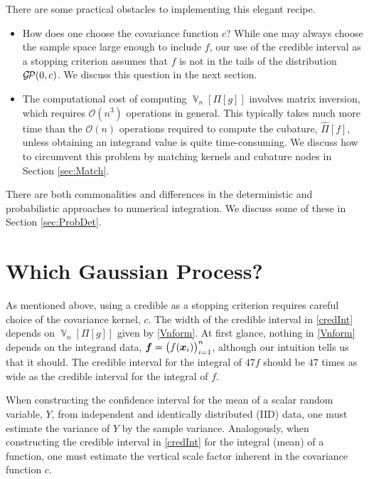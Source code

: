 \documentclass[sts]{imsart}
\numberwithin{equation}{section}
\theoremstyle{plain}
\newcommand{\calGP}{\cg\!\cp}
\DeclareMathOperator{\Var}{\mathbb{V}}
\begin{document}
There are some practical obstacles to implementing this elegant recipe. 

\begin{itemize} 

\item How does one choose the covariance function $c$?  While one may always choose the sample space large enough to include $f$, our use of the credible interval as a stopping criterion assumes that $f$ is not in the tails of the distribution $\calGP(0,c)$.  We discuss this question in the next section.  

\item The computational cost of computing $\Var_n[\Pi[g]]$ involves matrix inversion, which requires $\mathcal{O}(n^3)$ operations in general.  This typically takes much more time than the $\mathcal{O}(n)$ operations required to compute the cubature, $\hat{\Pi}[f]$, unless obtaining an integrand value is quite time-consuming. We discuss how to circumvent this problem by matching kernels and cubature nodes in Section \ref{sec:Match}.

\end{itemize}
There are both commonalities and differences in the deterministic and probabilistic approaches to numerical integration.  We discuss some of these in Section \ref{sec:ProbDet}.

\section{Which Gaussian Process?} \label{sec:WhichGauss}
As mentioned above, using a credible as a stopping criterion requires careful choice of the covariance kernel, $c$.  The width of the credible interval in \eqref{credInt} depends on $\Var_n[\Pi[g]]$ given by \eqref{Vnform}.  At first glance, nothing in \eqref{Vnform} depends on the integrand data, $\boldsymbol{f} = \bigl( f(\boldsymbol{x}_i) \bigr)_{i=1}^n$, although our intuition tells us that it should.  The credible interval for the integral of $47f$ should be $47$ times as wide as the credible interval for the integral of $f$.  

When constructing the confidence interval for the mean of a scalar random variable, $Y$, from independent and identically distributed (IID) data, one must estimate the variance of $Y$ by the sample variance. Analogously, when constructing the credible interval in \eqref{credInt} for the integral (mean) of a function, one must estimate the vertical scale factor inherent in the covariance function $c$.
\end{document}
